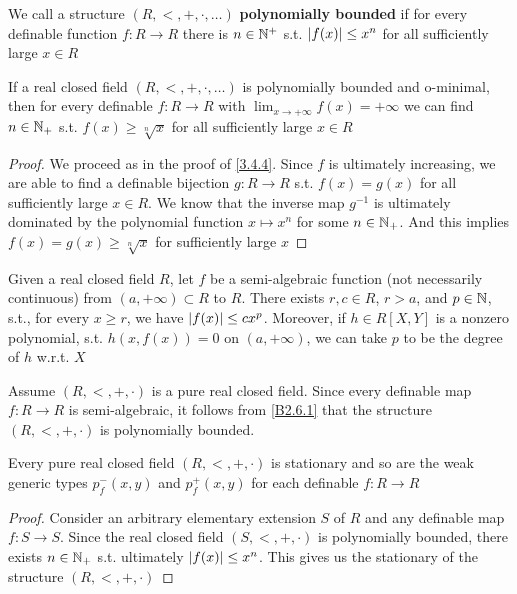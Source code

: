 \documentclass[11pt]{article}
\begin{document}
\begin{definition}[]
We call a structure \((R,<,+,\cdot,\dots)\) \textbf{polynomially bounded} if for every definable
function \(f:R\to R\) there is \(n\in\mathbb{N}^+\) s.t. \(\abs{f(x)}\le x^n\) for all sufficiently large \(x\in R\)
\end{definition}

\begin{remark}
\label{3.5.2}
If a real closed field \((R,<,+,\cdot,\dots)\) is polynomially bounded and o-minimal, then for every
definable \(f:R\to R\) with \(\lim_{x\to+\infty}f(x)=+\infty\) we can find \(n\in\mathbb{N}_+\) s.t. \(f(x)\ge\sqrt[n]{x}\)
for all sufficiently large \(x\in R\)
\end{remark}

\begin{proof}
We proceed as in the proof of \ref{3.4.4}. Since \(f\) is ultimately increasing, we are able to
find a definable bijection \(g:R\to R\) s.t. \(f(x)=g(x)\) for all sufficiently large \(x\in R\). We
know that the inverse map \(g^{-1}\) is ultimately dominated by the polynomial
function \(x\mapsto x^n\) for some \(n\in\mathbb{N}_+\). And this implies \(f(x)=g(x)\ge\sqrt[n]{x}\) for
sufficiently large \(x\)
\end{proof}

\begin{proposition}
\label{B2.6.1}
Given a real closed field \(R\), let \(f\) be a semi-algebraic function (not necessarily
continuous) from \((a,+\infty)\subset R\) to \(R\). There exists \(r,c\in R\), \(r>a\), and \(p\in\mathbb{N}\), s.t.,
for every \(x\ge r\), we have \(\abs{f(x)}\le cx^p\). Moreover, if \(h\in R[X,Y]\) is a nonzero
polynomial, s.t. \(h(x,f(x))=0\) on \((a,+\infty)\), we can take \(p\) to be the degree of \(h\) w.r.t. \(X\)
\end{proposition}


Assume \((R,<,+,\cdot)\) is a pure real closed field. Since every definable map \(f:R\to R\) is
semi-algebraic, it follows from \ref{B2.6.1} that the
structure \((R,<,+,\cdot)\) is polynomially bounded.

\begin{corollary}[]
Every pure real closed field \((R,<,+,\cdot)\) is stationary and so are the weak generic
types \(p_f^-(x,y)\) and \(p_f^+(x,y)\) for each definable \(f:R\to R\)
\end{corollary}

\begin{proof}
Consider an arbitrary elementary extension \(S\) of \(R\) and any definable map \(f:S\to S\).
Since the real closed field \((S,<,+,\cdot)\) is polynomially bounded, there exists \(n\in\mathbb{N}_+\) s.t.
ultimately \(\abs{f(x)}\le x^n\). This gives us the stationary of the structure \((R,<,+,\cdot)\)
\end{proof}
\end{document}
